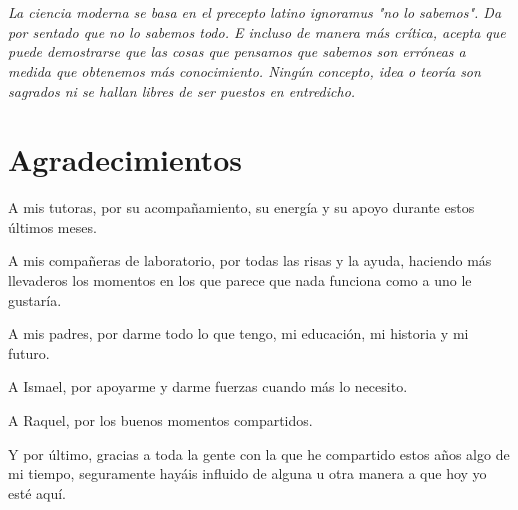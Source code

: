 
\chapter*{}

\vspace{15mm}


	
	\textit{La ciencia moderna se basa en el precepto latino ignoramus "no lo sabemos". Da por sentado que no lo sabemos todo. E incluso de manera más crítica, acepta que puede demostrarse que las cosas que pensamos que sabemos son erróneas a medida que obtenemos más conocimiento. Ningún concepto, idea o teoría son sagrados ni se hallan libres de ser puestos en entredicho. %
}

\vspace{5mm}

\begin{flushright}
	
\end{flushright}


\chapter*{Agradecimientos}

A mis tutoras, por su acompañamiento, su energía y su apoyo durante estos últimos meses.

A mis compañeras de laboratorio, por todas las risas y la ayuda, haciendo más llevaderos los momentos en los que parece que nada funciona como a uno le gustaría.

A mis padres, por darme todo lo que tengo, mi educación, mi historia y mi futuro.

A Ismael, por apoyarme y darme fuerzas cuando más lo necesito.

A Raquel, por los buenos momentos compartidos.

Y por último, gracias a toda la gente con la que he compartido estos años algo de mi tiempo, seguramente hayáis influido de alguna u otra manera a que hoy yo esté aquí.



